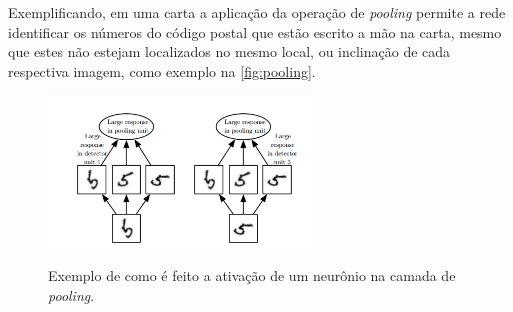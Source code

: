 \par Exemplificando, em uma carta a aplicação da operação de \textit{pooling} permite a rede identificar os números do código postal que estão escrito a mão na carta, mesmo que estes não estejam localizados no mesmo local, ou inclinação de cada respectiva imagem, como exemplo na \autoref{fig:pooling}. 
\begin{figure}[H]%
  \centering
  \caption{Exemplo de como é feito a ativação de um neurônio na camada de \textit{pooling}.}
  \includegraphics[width=200pt]{dados/figuras/pooling}
  \label{fig:pooling}
\end{figure} 

